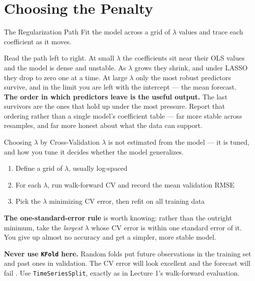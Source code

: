 \documentclass[aspectratio=169, 11pt]{beamer}
\begin{document}
\section{Choosing the Penalty}


\begin{frame}{The Regularization Path}
  Fit the model across a grid of $\lambda$ values and trace each coefficient as it moves.

  \vspace{0.15cm}
  Read the path left to right. At small $\lambda$ the coefficients sit near their OLS values
  and the model is dense and unstable. As $\lambda$ grows they shrink, and under LASSO they
  drop to zero one at a time. At large $\lambda$ only the most robust predictors survive, and
  in the limit you are left with the intercept --- the mean forecast.
  \vspace{0.15cm}
  \textbf{The order in which predictors leave is the useful output.} The last survivors are
  the ones that hold up under the most pressure. Report that ordering rather than a single
  model's coefficient table --- far more stable across resamples, and far more honest about
  what the data can support.
\end{frame}

\begin{frame}{Choosing $\lambda$ by Cross-Validation}
  $\lambda$ is not estimated from the model --- it is tuned, and how you tune it decides
  whether the model generalizes.
  \begin{enumerate}\small\itemsep0pt
    \item Define a grid of $\lambda$, usually log-spaced
    \item For each $\lambda$, run walk-forward CV and record the mean validation RMSE
    \item Pick the $\lambda$ minimizing CV error, then refit on all training data
  \end{enumerate}

  \vspace{0.1cm}
  \textbf{The one-standard-error rule} is worth knowing: rather than the outright minimum,
  take the \emph{largest} $\lambda$ whose CV error is within one standard error of it. You
  give up almost no accuracy and get a simpler, more stable model.
  \begin{warningbox}
    \textbf{Never use \texttt{KFold} here.} Random folds put future observations in the
    training set and past ones in validation. The CV error will look excellent and the
    forecast will fail \parencite{Bergmeir2018}. Use \texttt{TimeSeriesSplit}, exactly as in
    Lecture 1's walk-forward evaluation.
  \end{warningbox}
\end{frame}
\end{document}
